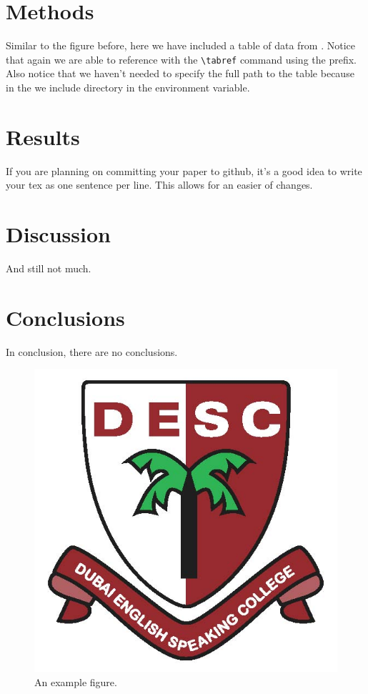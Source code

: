 \documentclass[\docopts]{\docclass}
\begin{document}
\section{Methods}
\label{sec:methods}

Similar to the figure before, here we have included a table of data from .
Notice that again we are able to reference  with the \verb=\tabref= command using the  prefix.
Also notice that we haven't needed to specify the full path to the table because in the  we include  directory in the  environment variable.



\section{Results}
\label{sec:results}

If you are planning on committing your paper to github, it's a good idea to write your tex as one sentence per line.
This allows for an easier  of changes.

\section{Discussion}
\label{sec:discussion}

And still not much.

\section{Conclusions}
\label{sec:conclusions}

In conclusion, there are no conclusions.

\begin{figure}
\includegraphics[width=\columnwidth]{example.jpg}
\caption{An example figure. \label{fig:example}}
\end{figure}





\end{document}
